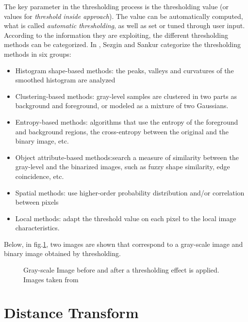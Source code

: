 The key parameter in the thresholding process is the thresholding value (or values for
\emph{threshold inside approach}). The value can be automatically computed, what is called
\emph{automatic thresholding}, as well as set or tuned through user input.\\
According to the information they are exploiting, the different thresholding methods can be 
categorized. In \cite[p.147]{thres}, Sezgin and Sankur categorize the thresholding methods in
six groups:
\begin{itemize}
\item Histogram shape-based methods: the peaks, valleys and curvatures of the smoothed
histogram are analyzed
\item Clustering-based methods: gray-level samples are clustered in two parts as
background and foreground, or modeled as a mixture of two Gaussians.
\item Entropy-based methods: algorithms that use the entropy of the foreground 
and background regions, the cross-entropy between the original and the binary image, 
etc.
\item Object attribute-based methods:search a measure of similarity between the 
gray-level and the binarized images, such as fuzzy shape similarity, 
edge coincidence, etc.
\item Spatial methods: use higher-order probability distribution and/or 
correlation between pixels
\item Local methods: adapt the threshold value on each pixel
to the local image characteristics.
\end{itemize}

Below, in fig.\ref{fig:thres1}, two images are shown that correspond to a gray-scale image
and binary image obtained by thresholding.

\begin{figure}[h t b p ! H]
  \centering
\qquad
  \caption{Gray-scale Image before and after a thresholding effect is applied. Images taken from \cite{web:thresholding}}
  \label{fig:thres1}
\end{figure}

\section{Distance Transform}
\label{sec:dt}

